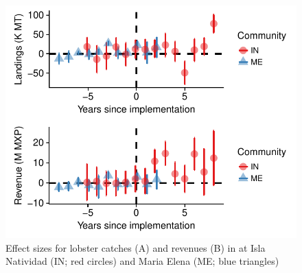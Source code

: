 \documentclass{frontiersSCNS}
\theoremstyle{definition}
\theoremstyle{definition}
\theoremstyle{definition}
\theoremstyle{remark}
\begin{document}
\begin{figure}
\centering
\includegraphics{Villasenor-Derbez_files/figure-latex/unnamed-chunk-8-1.pdf}
\caption{\label{fig:unnamed-chunk-8}\label{fig:lobsters}Effect sizes for
lobster catches (A) and revenues (B) in at Isla Natividad (IN; red
circles) and Maria Elena (ME; blue triangles)}
\end{figure}
\end{document}
